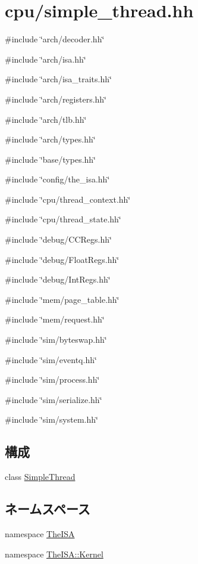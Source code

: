 \hypertarget{simple__thread_8hh}{
\section{cpu/simple\_\-thread.hh}
\label{simple__thread_8hh}
}
{\ttfamily \#include \char`\"{}arch/decoder.hh\char`\"{}}\par
{\ttfamily \#include \char`\"{}arch/isa.hh\char`\"{}}\par
{\ttfamily \#include \char`\"{}arch/isa\_\-traits.hh\char`\"{}}\par
{\ttfamily \#include \char`\"{}arch/registers.hh\char`\"{}}\par
{\ttfamily \#include \char`\"{}arch/tlb.hh\char`\"{}}\par
{\ttfamily \#include \char`\"{}arch/types.hh\char`\"{}}\par
{\ttfamily \#include \char`\"{}base/types.hh\char`\"{}}\par
{\ttfamily \#include \char`\"{}config/the\_\-isa.hh\char`\"{}}\par
{\ttfamily \#include \char`\"{}cpu/thread\_\-context.hh\char`\"{}}\par
{\ttfamily \#include \char`\"{}cpu/thread\_\-state.hh\char`\"{}}\par
{\ttfamily \#include \char`\"{}debug/CCRegs.hh\char`\"{}}\par
{\ttfamily \#include \char`\"{}debug/FloatRegs.hh\char`\"{}}\par
{\ttfamily \#include \char`\"{}debug/IntRegs.hh\char`\"{}}\par
{\ttfamily \#include \char`\"{}mem/page\_\-table.hh\char`\"{}}\par
{\ttfamily \#include \char`\"{}mem/request.hh\char`\"{}}\par
{\ttfamily \#include \char`\"{}sim/byteswap.hh\char`\"{}}\par
{\ttfamily \#include \char`\"{}sim/eventq.hh\char`\"{}}\par
{\ttfamily \#include \char`\"{}sim/process.hh\char`\"{}}\par
{\ttfamily \#include \char`\"{}sim/serialize.hh\char`\"{}}\par
{\ttfamily \#include \char`\"{}sim/system.hh\char`\"{}}\par
\subsection*{構成}
\begin{DoxyCompactItemize}
\item 
class \hyperlink{classSimpleThread}{SimpleThread}
\end{DoxyCompactItemize}
\subsection*{ネームスペース}
\begin{DoxyCompactItemize}
\item 
namespace \hyperlink{namespaceTheISA}{TheISA}
\item 
namespace \hyperlink{namespaceTheISA_1_1Kernel}{TheISA::Kernel}
\end{DoxyCompactItemize}
